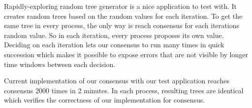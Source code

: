 \documentclass[times, 12pt,twocolumn]{article}
\begin{document}
Rapidly-exploring random tree generator is a nice application to test with. It creates random trees based on the random values for each iteration. To get the same tree in every process, the only way is reach consensus for each iterations random value. So in each iteration, every process proposes its own value. Deciding on each iteration lets our consensus to run many times in quick succession which makes it possible to expose errors that are not visible by longer time windows between each decision.
 


Current implementation of our consensus with our test application reaches consensus 2000 times in 2 minutes. In each process, resulting trees are identical which verifies the correctness of our implementation for consensus.





 
\end{document}
